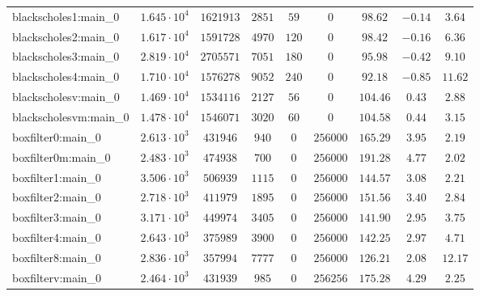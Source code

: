 \begin{tabular}{|l|c|c|c|c|c|c|c|c|}
blackscholes1:main\_0          & $ 1.645 \cdot 10^{4} $ & $ 1621913  $ & $ 2851   $ & $ 59   $ & $ 0        $ & $ 98.62       $ & $ -0.14   $ & $ 3.64    $ \\
blackscholes2:main\_0          & $ 1.617 \cdot 10^{4} $ & $ 1591728  $ & $ 4970   $ & $ 120  $ & $ 0        $ & $ 98.42       $ & $ -0.16   $ & $ 6.36    $ \\
blackscholes3:main\_0          & $ 2.819 \cdot 10^{4} $ & $ 2705571  $ & $ 7051   $ & $ 180  $ & $ 0        $ & $ 95.98       $ & $ -0.42   $ & $ 9.10    $ \\
blackscholes4:main\_0          & $ 1.710 \cdot 10^{4} $ & $ 1576278  $ & $ 9052   $ & $ 240  $ & $ 0        $ & $ 92.18       $ & $ -0.85   $ & $ 11.62   $ \\
blackscholesv:main\_0          & $ 1.469 \cdot 10^{4} $ & $ 1534116  $ & $ 2127   $ & $ 56   $ & $ 0        $ & $ 104.46      $ & $ 0.43    $ & $ 2.88    $ \\
blackscholesvm:main\_0         & $ 1.478 \cdot 10^{4} $ & $ 1546071  $ & $ 3020   $ & $ 60   $ & $ 0        $ & $ 104.58      $ & $ 0.44    $ & $ 3.15    $ \\
boxfilter0:main\_0             & $ 2.613 \cdot 10^{3} $ & $ 431946   $ & $ 940    $ & $ 0    $ & $ 256000   $ & $ 165.29      $ & $ 3.95    $ & $ 2.19    $ \\
boxfilter0m:main\_0            & $ 2.483 \cdot 10^{3} $ & $ 474938   $ & $ 700    $ & $ 0    $ & $ 256000   $ & $ 191.28      $ & $ 4.77    $ & $ 2.02    $ \\
boxfilter1:main\_0             & $ 3.506 \cdot 10^{3} $ & $ 506939   $ & $ 1115   $ & $ 0    $ & $ 256000   $ & $ 144.57      $ & $ 3.08    $ & $ 2.21    $ \\
boxfilter2:main\_0             & $ 2.718 \cdot 10^{3} $ & $ 411979   $ & $ 1895   $ & $ 0    $ & $ 256000   $ & $ 151.56      $ & $ 3.40    $ & $ 2.84    $ \\
boxfilter3:main\_0             & $ 3.171 \cdot 10^{3} $ & $ 449974   $ & $ 3405   $ & $ 0    $ & $ 256000   $ & $ 141.90      $ & $ 2.95    $ & $ 3.75    $ \\
boxfilter4:main\_0             & $ 2.643 \cdot 10^{3} $ & $ 375989   $ & $ 3900   $ & $ 0    $ & $ 256000   $ & $ 142.25      $ & $ 2.97    $ & $ 4.71    $ \\
boxfilter8:main\_0             & $ 2.836 \cdot 10^{3} $ & $ 357994   $ & $ 7777   $ & $ 0    $ & $ 256000   $ & $ 126.21      $ & $ 2.08    $ & $ 12.17   $ \\
boxfilterv:main\_0             & $ 2.464 \cdot 10^{3} $ & $ 431939   $ & $ 985    $ & $ 0    $ & $ 256256   $ & $ 175.28      $ & $ 4.29    $ & $ 2.25    $ \\

\end{tabular}
